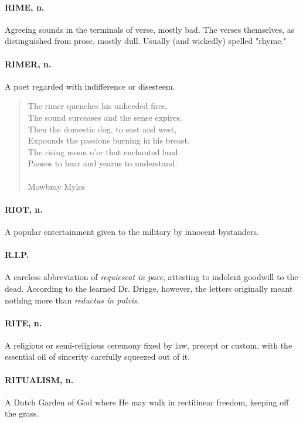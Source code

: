 \documentclass[11pt]{article}
\begin{document}
\paragraph{RIME, n.}  Agreeing sounds in the terminals of verse, mostly bad.  The
verses themselves, as distinguished from prose, mostly dull.  Usually
(and wickedly) spelled "rhyme."

\paragraph{RIMER, n.}  A poet regarded with indifference or disesteem.

\begin{quote}   The rimer quenches his unheeded fires, \\
  The sound surceases and the sense expires. \\
  Then the domestic dog, to east and west, \\
  Expounds the passions burning in his breast. \\
  The rising moon o'er that enchanted land \\
  Pauses to hear and yearns to understand. \\
 \\
Mowbray Myles \end{quote}


\paragraph{RIOT, n.}  A popular entertainment given to the military by innocent
bystanders.

\paragraph{R.I.P.}  A careless abbreviation of {\em requiescat in pace}, attesting to
indolent goodwill to the dead.  According to the learned Dr. Drigge,
however, the letters originally meant nothing more than {\em reductus in
pulvis}.

\paragraph{RITE, n.}  A religious or semi-religious ceremony fixed by law, precept
or custom, with the essential oil of sincerity carefully squeezed out
of it.

\paragraph{RITUALISM, n.}  A Dutch Garden of God where He may walk in rectilinear
freedom, keeping off the grass.
\end{document}
